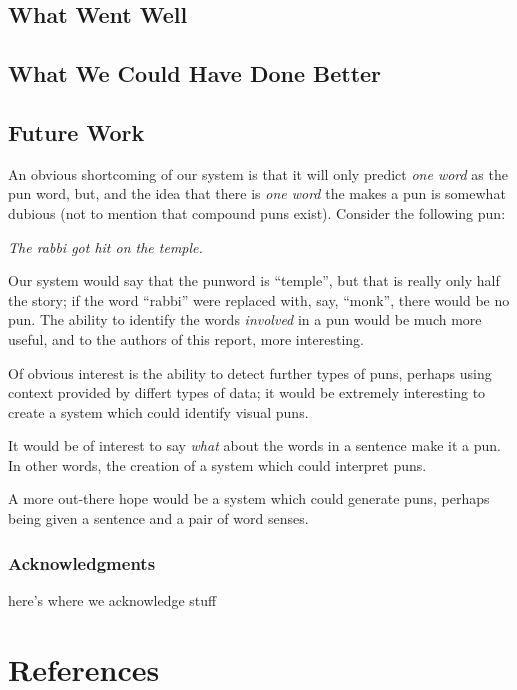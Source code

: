 \documentclass{article}
\begin{document}
\subsection{What Went Well}

\subsection{What We Could Have Done Better}

\subsection{Future Work}

An obvious shortcoming of our system is that it will only predict \emph{one
word} as the pun word, but, and the idea that there is \emph{one word} the makes
a pun is somewhat dubious (not to mention that compound puns exist). Consider
the following pun: 
\begin{center}
	\emph{The rabbi got hit on the temple.}
\end{center}
Our system would say that the punword is ``temple'', but that is really only half
the story; if the word ``rabbi'' were replaced with, say, ``monk'', there would
be no pun. The ability to identify the words \emph{involved} in a pun would be
much more useful, and to the authors of this report, more interesting.

Of obvious interest is the ability to detect further types of puns, perhaps
using context provided by differt types of data; it would be extremely
interesting to create a system which could identify visual puns. 

It would be of interest to say \emph{what} about the words in a sentence make it
a pun. In other words, the creation of a system which could interpret puns.

A more out-there hope would be a system which could generate puns, perhaps being
given a sentence and a pair of word senses.

\subsubsection*{Acknowledgments}

here's where we acknowledge stuff

\section*{References}
\end{document}
